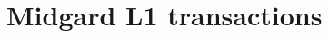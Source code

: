 \documentclass[../midgard.tex]{subfiles}
\begin{document}
\chapter{Midgard L1 transactions}
\label{h:midgard-l1-transactions}
\end{document}
